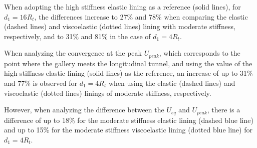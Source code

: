 \documentclass[a4paper,fleqn]{cas-sc}
\begin{document}
When adopting the high stiffness elastic lining as a reference (solid lines), for $d_1 = 16R_t$, the differences increase to 27\% and 78\% when comparing the elastic (dashed lines) and viscoelastic (dotted lines) lining with moderate stiffness, respectively, and to 31\% and 81\% in the case of $d_1=4R_t$.

When analyzing the convergence at the peak $U_{peak}$, which corresponds to the point where the gallery meets the longitudinal tunnel, and using the value of the high stiffness elastic lining (solid lines) as the reference, an increase of up to 31\% and 77\% is observed for $d_1=4R_t$ when using the elastic (dashed lines) and viscoelastic (dotted lines) linings of moderate stiffness, respectively.

However, when analyzing the difference between the $U_{eq}$ and $U_{peak}$, there is a difference of up to 18\% for the moderate stiffness elastic lining (dashed blue line) and up to 15\% for the moderate stiffness viscoelastic lining (dotted blue line) for $d_1=4R_t$.
\end{document}
